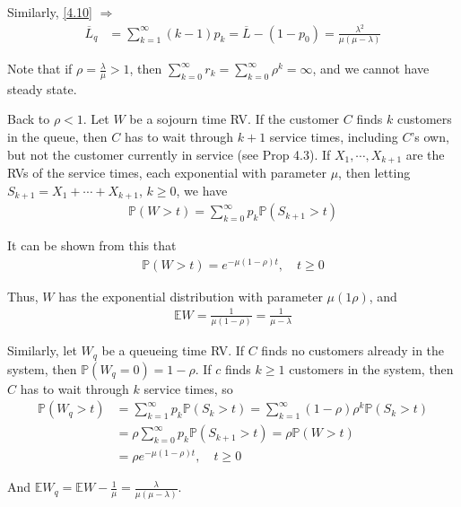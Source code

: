 Similarly, \ref{4.10} $\Rightarrow$
\begin{align*}
    \overline{L}_q &= \sum\limits_{k=1}^{\infty} (k-1)p_k = \overline{L} - (1-p_0) = \frac{\lambda^2}{\mu(\mu - \lambda)}
\end{align*}

Note that if $\rho = \frac{\lambda}{\mu} > 1$, then $\sum\limits_{k=0}^{\infty} r_k = \sum\limits_{k=0}^{\infty} \rho^k = \infty$, and we cannot have steady state.

Back to $\rho<1$. Let $W$ be a sojourn time RV. If the customer $C$ finds $k$ customers in the queue, then $C$ has to wait through $k + 1$ service times, including $C$'s own, but not the customer currently in service (see Prop 4.3). If $X_1,\cdots, X_{k+1}$ are the RVs of the service times, each exponential with parameter $\mu$, then letting $S_{k+1} = X_1 + \cdots + X_{k+1}$, $k\geqslant 0$, we have
\begin{align*}
    \mathbb{P}(W>t) = \sum\limits_{k=0}^{\infty} p_k \mathbb{P}(S_{k+1}>t)
\end{align*}

It can be shown from this that 
\begin{align*}
    \mathbb{P}(W>t) = e^{-\mu(1-\rho)t},\quad t\geqslant 0
\end{align*}

Thus, $W$ has the exponential distribution with parameter $\mu(1\rho)$, and 
\begin{align*}
    \mathbb{E} W = \frac{1}{\mu(1-\rho)} = \frac{1}{\mu - \lambda}
\end{align*}

Similarly, let $W_q$ be a queueing time RV. If $C$ finds no customers already in the system, then $\mathbb{P}(W_q = 0) = 1-\rho$. If $c$ finds $k\geqslant 1$ customers in the system, then $C$ has to wait through $k$ service times, so 
\begin{align*}
    \mathbb{P}(W_q > t) &= \sum\limits_{k=1}^{\infty} p_k \mathbb{P}(S_k>t) = \sum\limits_{k=1}^{\infty} (1-\rho)\rho^k \mathbb{P}(S_k>t) \\
    &= \rho\sum\limits_{k=0}^{\infty} p_k \mathbb{P}(S_{k+1}>t) = \rho\mathbb{P}(W>t) \\
    & = \rho e^{-\mu(1-\rho)t},\quad t\geqslant 0
\end{align*}

And $\mathbb{E} W_q = \mathbb{E} W - \frac{1}{\mu} = \frac{\lambda}{\mu(\mu - \lambda)}$.

